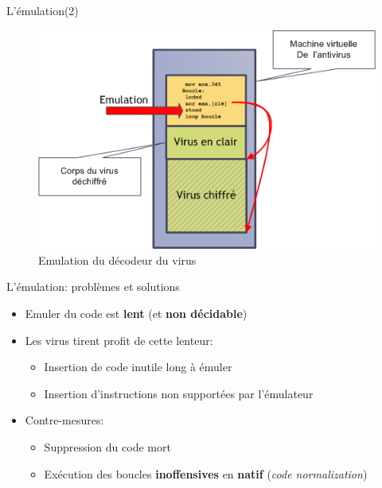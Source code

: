 \documentclass{beamer}
\begin{document}
\begin{frame}{L'émulation(2)}
\begin{figure}[!ht]
\includegraphics[scale=0.4]{emu.png}
\center
\caption{Emulation du décodeur du virus}
\end{figure}
\end{frame}


\begin{frame}{L'émulation: problèmes et solutions}
\begin{itemize}
\item Emuler du code est \textbf{lent} (et \textbf{non décidable})
\item Les virus tirent profit de cette lenteur:
\begin{itemize}
\item Insertion de code inutile long à émuler
\item Insertion d'instructions non supportées par l'émulateur
\end{itemize}
\item Contre-mesures:
\begin{itemize}
\item Suppression du code mort
\item Exécution des boucles \textbf{inoffensives} en \textbf{natif} (\textit{code normalization})
\end{itemize}
\end{itemize}
\end{frame}
\end{document}
